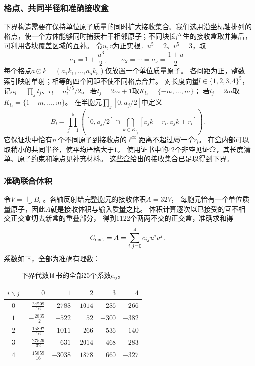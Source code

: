 \documentclass[UTF8,fontset=fandol,zihao=-4,a4paper]{ctexart}
\newcommand{\1}{\mathbf 1}
\begin{document}
\subsubsection{格点、共同半径和准确接收盒}
下界构造需要在保持单位原子质量的同时扩大接收集合。我们选用沿坐标轴排列的格点，使一个方体能够同时捕获若干相邻原子；不同块长产生的接收盒取并集后，可利用各块覆盖区域的互补。
令$u,v$为正实根，$u^5=2$、$v^5=3$，取
\[
 a_1=1+\frac{u^3}{2},\qquad a_2=\cdots=a_5=\frac{1+u}{2}.
\]
每个格点$a\odot k=(a_1k_1,\ldots,a_5k_5)$仅放置一个单位质量原子。
各间距为正，整数索引映射单射；相等的四个间距不使不同格点合并。
对长度向量$l\in\{1,2,3,4\}^5$，记$n_l=\prod_jl_j$、$r_l=n_l^{1/5}/2$。
若$l_j=2m+1$取$K_{l_j}=\{-m,\ldots,m\}$；
若$l_j=2m$取$K_{l_j}=\{1-m,\ldots,m\}$。
在半胞元$\prod_j[0,a_j/2]$中定义
\[
 B_l=\prod_{j=1}^5\left([0,a_j/2]\cap
           \bigcap_{k\in K_{l_j}}[a_jk-r_l,a_jk+r_l]\right).
\]
它保证块中恰有$n_l$个不同原子到接收点的$\ell^\infty$距离不超过\emph{同一个}$r_l$。
在盒内部可以取稍小的共同半径，使平均严格大于$1$。
使用证书中的42个非空见证盒，其长度清单、原子约束和端点见补充材料。
这些盒给出的接收集合已足以得到下界。

\subsubsection{准确联合体积}
令$V=|\bigcup B_l|$。各轴反射给完整胞元的接收体积$A=32V$，
每胞元恰有一个单位质量原子，因此$A$就是接收体积与输入质量之比。
体积计算逐次以已接受的互不相交正交盒切去新盒的重叠部分，
得到1122个两两不交的正交盒，准确求和得
\[
 C_{\rm cert}=A=\sum_{i,j=0}^4c_{ij}u^iv^j.
\]
系数如下，全部为准确有理数：

\begin{table}[ht]\centering\small
\begin{tabular}{c|rrrrr}
\toprule $i\backslash j$&$0$&$1$&$2$&$3$&$4$\\\midrule
$0$&$\frac{34599}{16}$&$-2788$&$1014$&$286$&$-266$\\
$1$&$-\frac{2835}{2}$&$-522$&$152$&$-300$&$-382$\\
$2$&$-\frac{15897}{16}$&$-1011$&$-266$&$536$&$-140$\\
$3$&$\frac{27529}{32}$&$-631$&$2014$&$468$&$-283$\\
$4$&$\frac{15859}{16}$&$-3038$&$1878$&$660$&$-327$\\
\bottomrule\end{tabular}
\caption{下界代数证书的全部25个系数$c_{ij}$。}\label{tab:lowercoeff}
\end{table}
\end{document}

